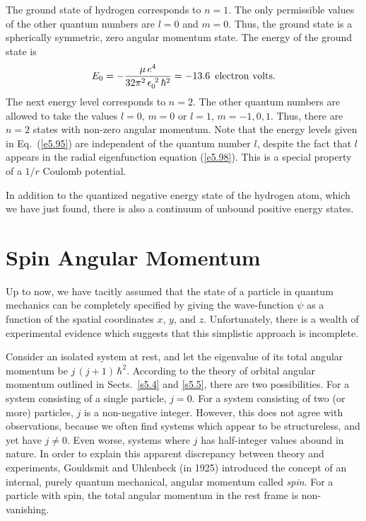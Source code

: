 The ground state of hydrogen corresponds to $n=1$. The only permissible values
of the other quantum numbers are $l=0$ and $m=0$. Thus, the ground state is
a spherically symmetric,  zero angular momentum state. The energy of the
ground state is
\begin{equation}
E_0 = - \frac{\mu \,e^4}{32\pi^2\,\epsilon_0^{~2}\, \hbar^2} = -13.6\,\,\,{\rm electron~volts}.
\end{equation}
The next energy level corresponds to $n=2$. The other quantum numbers are
allowed to take the values $l=0$, $m=0$ or $l=1$, $m=-1, 0, 1$. Thus, there are
$n=2$ states with non-zero angular momentum. Note that the energy levels given
in Eq.~(\ref{e5.95}) are independent of the quantum number $l$, despite the fact that
$l$ appears in the radial eigenfunction equation (\ref{e5.98}). This is a special
property of a $1/r$ Coulomb potential. 

In addition to the quantized negative energy state of the
hydrogen atom, which we have just found, there
is  also a continuum of unbound positive energy states. 

\section{Spin Angular Momentum}
Up to now, we have tacitly assumed that the state of a particle in quantum
mechanics can be completely specified by giving the wave-function $\psi$ 
as a function of the spatial coordinates $x$, $y$, and $z$. Unfortunately,
there is a wealth of experimental evidence which suggests that this simplistic
approach is incomplete. 

Consider an isolated system at rest, and let the eigenvalue of its total
angular momentum be $j\,(j+1)\,\hbar^2$. According to the theory of orbital
angular momentum outlined in Sects.~\ref{s5.4} and \ref{s5.5}, there are two possibilities.
For a system consisting of a single particle, $j=0$. For a system consisting
of two (or more) particles, $j$ is a non-negative integer. 
However, this does not
agree with observations, because we often find systems which appear to
be structureless, and yet have $j\neq 0$. Even worse, systems where $j$
has half-integer values abound in nature. 
In order to  explain this apparent discrepancy
between theory and experiments, Gouldsmit and Uhlenbeck (in 1925)
introduced the concept of an internal, purely quantum mechanical, angular momentum
called {\em spin}. For a particle with spin, the total angular momentum in the
rest frame is non-vanishing. 

